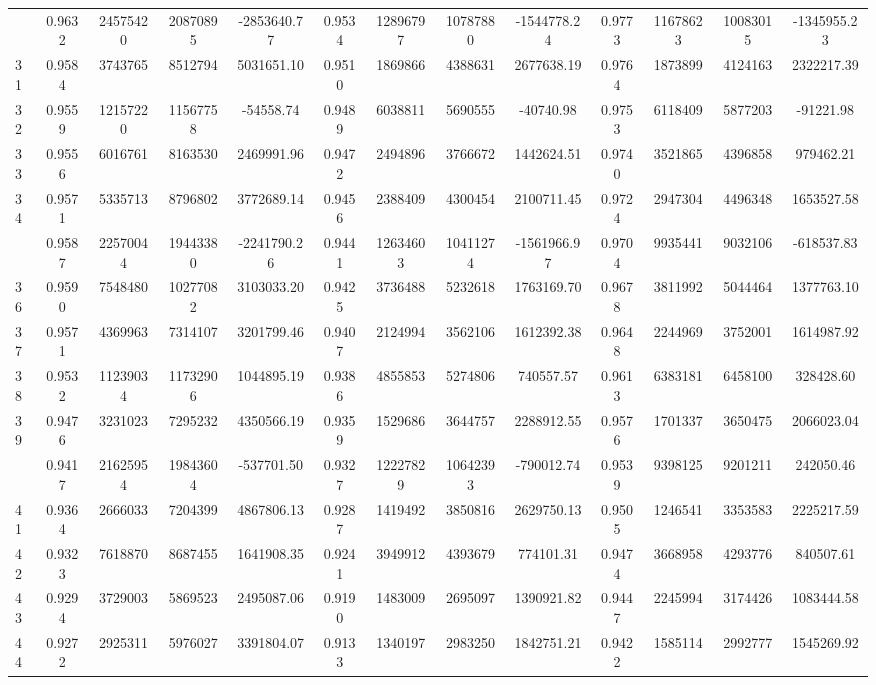 \documentclass[
  12pt,
]{article}
\begin{document}
\begin{longtable}[t]{lcccccccccccc}
\addlinespace
30 & 0.9632 & 24575420 & 20870895 & -2853640.77 & 0.9534 & 12896797 & 10787880 & -1544778.24 & 0.9773 & 11678623 & 10083015 & -1345955.23\\
31 & 0.9584 & 3743765 & 8512794 & 5031651.10 & 0.9510 & 1869866 & 4388631 & 2677638.19 & 0.9764 & 1873899 & 4124163 & 2322217.39\\
32 & 0.9559 & 12157220 & 11567758 & -54558.74 & 0.9489 & 6038811 & 5690555 & -40740.98 & 0.9753 & 6118409 & 5877203 & -91221.98\\
33 & 0.9556 & 6016761 & 8163530 & 2469991.96 & 0.9472 & 2494896 & 3766672 & 1442624.51 & 0.9740 & 3521865 & 4396858 & 979462.21\\
34 & 0.9571 & 5335713 & 8796802 & 3772689.14 & 0.9456 & 2388409 & 4300454 & 2100711.45 & 0.9724 & 2947304 & 4496348 & 1653527.58\\
\addlinespace
35 & 0.9587 & 22570044 & 19443380 & -2241790.26 & 0.9441 & 12634603 & 10411274 & -1561966.97 & 0.9704 & 9935441 & 9032106 & -618537.83\\
36 & 0.9590 & 7548480 & 10277082 & 3103033.20 & 0.9425 & 3736488 & 5232618 & 1763169.70 & 0.9678 & 3811992 & 5044464 & 1377763.10\\
37 & 0.9571 & 4369963 & 7314107 & 3201799.46 & 0.9407 & 2124994 & 3562106 & 1612392.38 & 0.9648 & 2244969 & 3752001 & 1614987.92\\
38 & 0.9532 & 11239034 & 11732906 & 1044895.19 & 0.9386 & 4855853 & 5274806 & 740557.57 & 0.9613 & 6383181 & 6458100 & 328428.60\\
39 & 0.9476 & 3231023 & 7295232 & 4350566.19 & 0.9359 & 1529686 & 3644757 & 2288912.55 & 0.9576 & 1701337 & 3650475 & 2066023.04\\
\addlinespace
40 & 0.9417 & 21625954 & 19843604 & -537701.50 & 0.9327 & 12227829 & 10642393 & -790012.74 & 0.9539 & 9398125 & 9201211 & 242050.46\\
41 & 0.9364 & 2666033 & 7204399 & 4867806.13 & 0.9287 & 1419492 & 3850816 & 2629750.13 & 0.9505 & 1246541 & 3353583 & 2225217.59\\
42 & 0.9323 & 7618870 & 8687455 & 1641908.35 & 0.9241 & 3949912 & 4393679 & 774101.31 & 0.9474 & 3668958 & 4293776 & 840507.61\\
43 & 0.9294 & 3729003 & 5869523 & 2495087.06 & 0.9190 & 1483009 & 2695097 & 1390921.82 & 0.9447 & 2245994 & 3174426 & 1083444.58\\
44 & 0.9272 & 2925311 & 5976027 & 3391804.07 & 0.9133 & 1340197 & 2983250 & 1842751.21 & 0.9422 & 1585114 & 2992777 & 1545269.92\\

\end{longtable}
\end{document}
